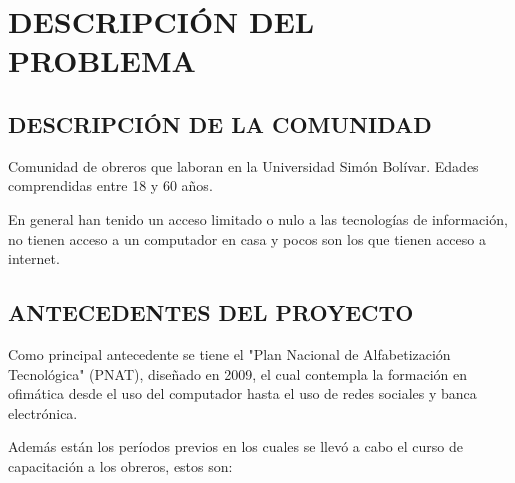 	\section{DESCRIPCIÓN DEL PROBLEMA}
    
		\subsection{DESCRIPCIÓN DE LA COMUNIDAD}
			Comunidad de obreros que laboran en la Universidad Simón Bolívar. Edades comprendidas entre 18 y 60 años.
            
            En general han tenido un acceso limitado o nulo a las tecnologías de información, no tienen acceso a un computador en casa y pocos son los que tienen acceso a internet.
            
		\subsection{ANTECEDENTES DEL PROYECTO}
            Como principal antecedente se tiene el "Plan Nacional de Alfabetización Tecnológica" (PNAT), diseñado en 2009, el cual contempla la formación en ofimática desde el  uso del computador hasta el uso de redes sociales y banca electrónica.
            
            Además están los períodos previos en los cuales se llevó a cabo el curso de capacitación a los obreros, estos son:
            
